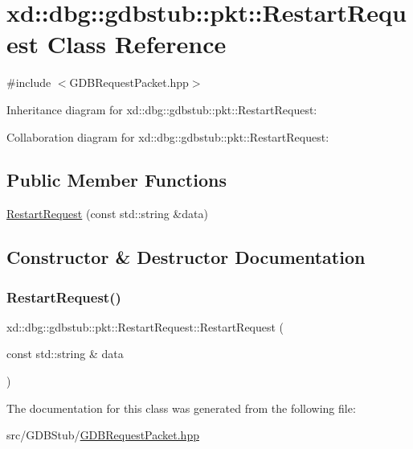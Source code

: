 \hypertarget{classxd_1_1dbg_1_1gdbstub_1_1pkt_1_1_restart_request}{}\section{xd\+:\+:dbg\+:\+:gdbstub\+:\+:pkt\+:\+:Restart\+Request Class Reference}
\label{classxd_1_1dbg_1_1gdbstub_1_1pkt_1_1_restart_request}


{\ttfamily \#include $<$G\+D\+B\+Request\+Packet.\+hpp$>$}



Inheritance diagram for xd\+:\+:dbg\+:\+:gdbstub\+:\+:pkt\+:\+:Restart\+Request\+:


Collaboration diagram for xd\+:\+:dbg\+:\+:gdbstub\+:\+:pkt\+:\+:Restart\+Request\+:
\subsection*{Public Member Functions}
\begin{DoxyCompactItemize}
\item 
\mbox{\hyperlink{classxd_1_1dbg_1_1gdbstub_1_1pkt_1_1_restart_request_a29ebf2d23b2abe6f102f19f14f133a07}{Restart\+Request}} (const std\+::string \&data)
\end{DoxyCompactItemize}


\subsection{Constructor \& Destructor Documentation}
\mbox{\label{classxd_1_1dbg_1_1gdbstub_1_1pkt_1_1_restart_request_a29ebf2d23b2abe6f102f19f14f133a07}} 
\subsubsection{\texorpdfstring{Restart\+Request()}{RestartRequest()}}
{\footnotesize\ttfamily xd\+::dbg\+::gdbstub\+::pkt\+::\+Restart\+Request\+::\+Restart\+Request (\begin{DoxyParamCaption}\item[{const std\+::string \&}]{data }\end{DoxyParamCaption})\hspace{0.3cm}{\ttfamily [inline]}}



The documentation for this class was generated from the following file\+:\begin{DoxyCompactItemize}
\item 
src/\+G\+D\+B\+Stub/\mbox{\hyperlink{_g_d_b_request_packet_8hpp}{G\+D\+B\+Request\+Packet.\+hpp}}\end{DoxyCompactItemize}
